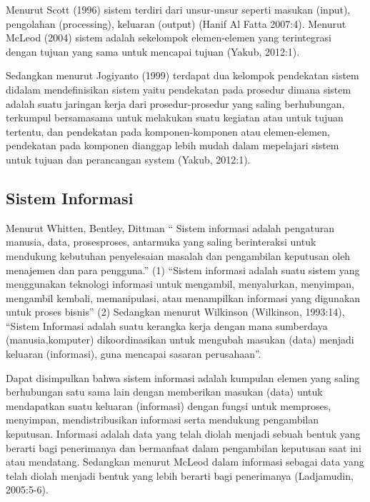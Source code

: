 Menurut Scott (1996) sistem terdiri dari unsur-unsur seperti masukan (input), pengolahan (processing), keluaran (output) (Hanif Al Fatta 2007:4). Menurut McLeod (2004) sistem adalah sekelompok elemen-elemen yang terintegrasi dengan tujuan yang sama untuk mencapai tujuan (Yakub, 2012:1).  

Sedangkan menurut Jogiyanto (1999) terdapat dua kelompok pendekatan sistem didalam mendefinisikan sistem yaitu pendekatan pada prosedur dimana sistem adalah suatu jaringan kerja dari prosedur-prosedur yang saling berhubungan, terkumpul bersamasama untuk melakukan suatu kegiatan atau untuk tujuan tertentu, dan pendekatan pada komponen-komponen atau elemen-elemen, pendekatan pada komponen dianggap lebih mudah dalam mepelajari sistem untuk tujuan dan perancangan system (Yakub, 2012:1). 

\subsection{Sistem Informasi}
Menurut Whitten, Bentley, Dittman “ Sistem informasi adalah pengaturan manusia, data, prosesproses, antarmuka yang saling berinteraksi untuk mendukung kebutuhan penyelesaian masalah dan pengambilan keputusan oleh menajemen dan para pengguna.”  (1) “Sistem informasi adalah suatu sistem yang menggunakan teknologi informasi untuk mengambil, menyalurkan, menyimpan, mengambil kembali, memanipulasi, atau menampilkan informasi yang digunakan untuk proses bisnis” (2) Sedangkan menurut Wilkinson (Wilkinson, 1993:14), “Sistem Informasi adalah suatu kerangka kerja dengan mana sumberdaya (manusia,komputer) dikoordinasikan untuk mengubah masukan (data) menjadi keluaran (informasi), guna mencapai sasaran perusahaan”.

Dapat disimpulkan bahwa sistem informasi adalah kumpulan elemen yang saling berhubungan satu sama lain dengan memberikan masukan (data) untuk mendapatkan suatu keluaran (informasi) dengan fungsi untuk memproses, menyimpan, mendistribusikan informasi serta mendukung pengambilan keputusan.
Informasi adalah data yang telah diolah menjadi sebuah bentuk yang berarti bagi penerimanya dan bermanfaat dalam pengambilan keputusan saat ini atau mendatang. Sedangkan menurut McLeod dalam informasi sebagai data yang telah diolah menjadi bentuk yang lebih berarti bagi penerimanya (Ladjamudin, 2005:5-6).


